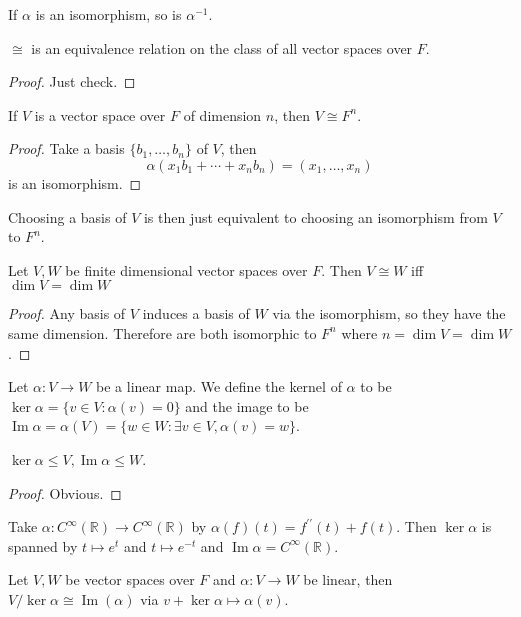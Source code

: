 \begin{remark}
    If $\alpha$ is an isomorphism, so is $\alpha^{-1}$.
\end{remark}
\begin{lemma}
    $\cong$ is an equivalence relation on the class of all vector spaces over $F$.
\end{lemma}
\begin{proof}
    Just check.
\end{proof}
\begin{theorem}
    If $V$ is a vector space over $F$ of dimension $n$, then $V\cong F^n$.
\end{theorem}
\begin{proof}
    Take a basis $\{b_1,\ldots,b_n\}$ of $V$, then
    $$\alpha(x_1b_1+\cdots+x_nb_n)=(x_1,\ldots,x_n)$$
    is an isomorphism.
\end{proof}
\begin{remark}
    Choosing a basis of $V$ is then just equivalent to choosing an isomorphism from $V$ to $F^n$.
\end{remark}
\begin{theorem}
    Let $V,W$ be finite dimensional vector spaces over $F$.
    Then $V\cong W$ iff $\dim V=\dim W$
\end{theorem}
\begin{proof}
    Any basis of $V$ induces a basis of $W$ via the isomorphism, so they have the same dimension.
    Therefore are both isomorphic to $F^n$ where $n=\dim V=\dim W$.
\end{proof}
\begin{definition}
    Let $\alpha:V\to W$ be a linear map.
    We define the kernel of $\alpha$ to be $\ker\alpha=\{v\in V:\alpha(v)=0\}$ and the image to be $\operatorname{Im}\alpha=\alpha(V)=\{w\in W:\exists v\in V,\alpha(v)=w\}$.
\end{definition}
\begin{lemma}
    $\ker\alpha\le V,\operatorname{Im}\alpha\le W$.
\end{lemma}
\begin{proof}
    Obvious.
\end{proof}
\begin{example}
    Take $\alpha:C^\infty(\mathbb R)\to C^\infty(\mathbb R)$ by $\alpha(f)(t)=f^{\prime\prime}(t)+f(t)$.
    Then $\ker\alpha$ is spanned by $t\mapsto e^t$ and $t\mapsto e^{-t}$ and $\operatorname{Im}\alpha=C^{\infty}(\mathbb R)$.
\end{example}
\begin{theorem}
    Let $V,W$ be vector spaces over $F$ and $\alpha:V\to W$ be linear, then $V/{\ker\alpha}\cong \operatorname{Im}(\alpha)$ via $v+\ker\alpha\mapsto \alpha(v)$.
\end{theorem}
